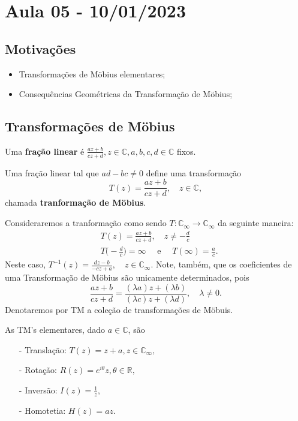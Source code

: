 \documentclass[complex.tex]{subfiles}
\begin{document}
\section{Aula 05 - 10/01/2023}
\subsection{Motivações}
\begin{itemize}
	\item Transformações de M\"{o}bius elementares;
	\item Consequências Geométricas da Transformação de M\"{o}bius;
\end{itemize}
\subsection{Transformações de M\"{o}bius}
\begin{def*}
	Uma \textbf{fração linear} é $\frac{az + b}{cz + d}, z\in \mathbb{C}, a, b, c, d\in \mathbb{C}$ fixos.
\end{def*}
\begin{def*}
	Uma fração linear tal que $ad-bc\neq0$ define uma transformação
	$$
		T(z) = \frac{az + b}{cz + d}, \quad z\in \mathbb{C},
	$$
	chamada \textbf{tranformação de M\"{o}bius}.
\end{def*}
Consideraremos a tranformação como sendo $T:\mathbb{C}_{\infty}\rightarrow \mathbb{C}_{\infty}$ da seguinte
maneira:
\begin{align*}
	 & T(z) = \frac{az + b}{cz + d}, \quad z\neq -\frac{d}{c}                             \\
	 & T\biggl(-\frac{d}{c}\biggr) = \infty \quad\text{ e }\quad T(\infty) = \frac{a}{c}.
\end{align*}
Neste caso, $T ^{-1}(z) = \displaystyle\frac{dz - b}{-cz + a}, \quad z\in \mathbb{C}_{\infty}.$ Note, também, que os coeficientes
de uma Transformação de M\"{o}bius são unicamente determinados, pois
$$
	\frac{az + b}{cz + d} = \frac{(\lambda a)z + (\lambda b)}{(\lambda c)z + (\lambda d)}, \quad \lambda\neq0.
$$
Denotaremos por TM a coleção de transformações de M\"{o}buis.
\begin{example}
	As TM's elementares, dado $a\in \mathbb{C}$, são
	\begin{itemize}
		\item[-] Translação: $T(z) = z + a, z\in \mathbb{C}_{\infty},$
		\item[-] Rotação: $R(z) = e^{i \theta}z, \theta\in \mathbb{R},$
		\item[-] Inversão: $I(z) = \frac{1}{z},$
		\item[-] Homotetia: $H(z) = az.$
	\end{itemize}
\end{example}
\end{document}
